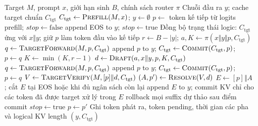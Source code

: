 \begin{algorithm}[H]
\caption{Chu kỳ giải mã của ZASSD}\label{alg:zassd-decode}
\footnotesize
\begin{algorithmic}[1]
\Require Target $M$, prompt $x$, giới hạn sinh $B$, chính sách router $\pi$
\Ensure Chuỗi đầu ra $y$; cache target chuẩn $C_{\mathrm{tgt}}$
\State $C_{\mathrm{tgt}}\gets\Call{Prefill}{M,x}$; $y\gets\emptyset$
\State $p\gets$ token kế tiếp từ logits prefill; $stop\gets\mathrm{false}$ 
        \State append EOS to $y$; $stop\gets\mathrm{true}$ 
    \Else
    \State Đồng bộ trạng thái logic: $C_{\mathrm{tgt}}$ ứng với $x\Vert y$; giữ $p$ làm token đầu vào kế tiếp
    \State $r\gets B-|y|$; $a,K\gets\pi(x\Vert y\Vert p,C_{\mathrm{tgt}})$
        \State $q\gets\Call{TargetForward}{M,p,C_{\mathrm{tgt}}}$ 
        \State append $p$ to $y$; $C_{\mathrm{tgt}}\gets\Call{Commit}{C_{\mathrm{tgt}},p}$; $p\gets q$
    \Else
        \State $K\gets\min(K,r-1)$ 
        \State $d\gets\Call{Draft}{a,x\Vert y,p,K,C_{\mathrm{tgt}}}$
            \State $q\gets\Call{TargetForward}{M,p,C_{\mathrm{tgt}}}$
            \State append $p$ to $y$; $C_{\mathrm{tgt}}\gets\Call{Commit}{C_{\mathrm{tgt}},p}$; $p\gets q$
        \Else
            \State $V\gets\Call{TargetVerify}{M,[p]\Vert d,C_{\mathrm{tgt}}}$
            \State $(A,p')\gets\Call{Resolve}{V,d}$ 
            \State $E\gets[p]\Vert A$; cắt $E$ tại EOS hoặc khi đủ ngân sách còn lại
            \State append $E$ to $y$; commit KV chỉ cho các token đã được target xử lý trong $E$
            \State rollback mọi suffix dự thảo sau điểm commit
                \State $stop\gets\mathrm{true}$
            \Else
                \State $p\gets p'$ 
            \EndIf
        \EndIf
    \EndIf
    \State Ghi token phát ra, token pending, thời gian các pha và logical KV length
    \EndIf
\EndWhile
\State \Return $(y,C_{\mathrm{tgt}})$
\end{algorithmic}
\normalsize
\end{algorithm}

